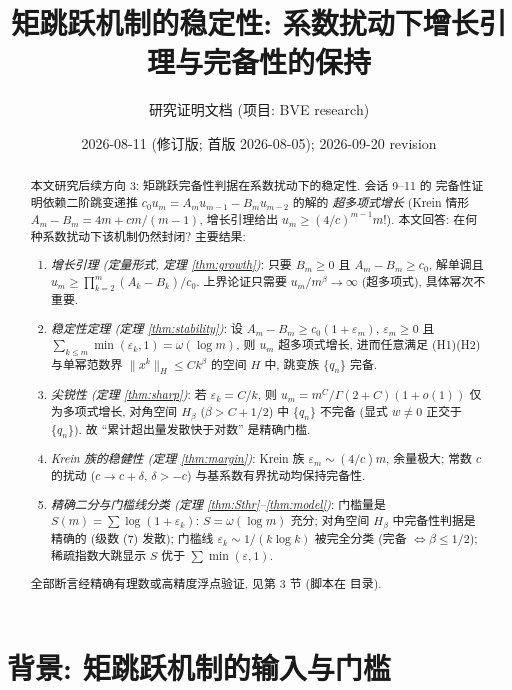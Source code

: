 \documentclass[UTF8]{ctexart}
\title{矩跳跃机制的稳定性: 系数扰动下增长引理与完备性的保持}
\author{研究证明文档 (项目: BVE research)}
\date{2026-08-11 (修订版; 首版 2026-08-05); 2026-09-20 revision}
\begin{document}
\maketitle

\begin{abstract}
本文研究后续方向 3: 矩跳跃完备性判据在系数扰动下的稳定性. 会话 9--11 的
完备性证明依赖二阶跳变递推 $c_0 u_m = A_m u_{m-1} - B_m u_{m-2}$ 的解的
\emph{超多项式增长} (Krein 情形 $A_m - B_m = 4m + cm/(m-1)$, 增长引理给出
$u_m \geq (4/c)^{m-1} m!$). 本文回答: 在何种系数扰动下该机制仍然封闭?
主要结果:
\begin{enumerate}
	\item \emph{增长引理 (定量形式, 定理 \ref{thm:growth})}: 只要 $B_m \geq 0$
		且 $A_m - B_m \geq c_0$, 解单调且 $u_m \geq \prod_{k=2}^m (A_k-B_k)/c_0$.
		上界论证只需要 $u_m/m^\beta \to \infty$ (超多项式), 具体幂次不重要.
	\item \emph{稳定性定理 (定理 \ref{thm:stability})}: 设
		$A_m - B_m \geq c_0(1+\varepsilon_m)$, $\varepsilon_m \geq 0$ 且
		$\sum_{k \leq m} \min(\varepsilon_k, 1) = \omega(\log m)$, 则
		$u_m$ 超多项式增长, 进而任意满足 (H1)(H2) 与单幂范数界
		$\|x^k\|_H \leq C k^\beta$ 的空间 $H$ 中, 跳变族 $\{q_n\}$ 完备.
	\item \emph{尖锐性 (定理 \ref{thm:sharp})}: 若 $\varepsilon_k = C/k$, 则
		$u_m = m^C/\Gamma(2+C)(1+o(1))$ 仅为多项式增长, 对角空间
		$H_\beta$ ($\beta > C+1/2$) 中 $\{q_n\}$ 不完备 (显式
		$w \neq 0$ 正交于 $\{q_n\}$). 故 ``累计超出量发散快于对数''
		是精确门槛.
	\item \emph{Krein 族的稳健性 (定理 \ref{thm:margin})}: Krein 族
		$\varepsilon_m \sim (4/c)m$, 余量极大; 常数 $c$ 的扰动
		($c \to c+\delta$, $\delta > -c$) 与基系数有界扰动均保持完备性.
	\item \emph{精确二分与门槛线分类 (定理 \ref{thm:Sthr}--\ref{thm:model})}:
		门槛量是 $S(m) = \sum \log(1+\varepsilon_k)$: $S = \omega(\log m)$
		充分; 对角空间 $H_\beta$ 中完备性判据是精确的
		(级数 (7) 发散); 门槛线 $\varepsilon_k \sim 1/(k\log k)$ 被完全分类
		(完备 $\iff \beta \leq 1/2$); 稀疏指数大跳显示 $S$ 优于
		$\sum\min(\varepsilon,1)$.
\end{enumerate}
全部断言经精确有理数或高精度浮点验证, 见第 3 节 (脚本在  目录).
\end{abstract}

\tableofcontents

\section{背景: 矩跳跃机制的输入与门槛}
\end{document}
